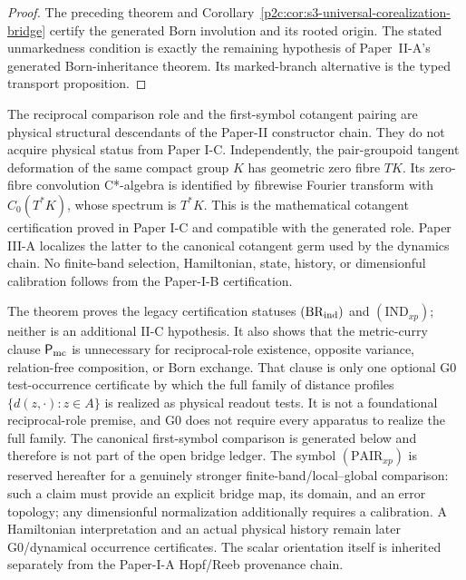 \documentclass[12pt,a4paper]{article}
\begin{document}
\begin{proof}
The preceding theorem and
Corollary~\ref{p2c:cor:s3-universal-corealization-bridge} certify the generated
Born involution and its rooted origin.  The stated unmarkedness condition is
exactly the remaining hypothesis of Paper~II-A's generated Born-inheritance
theorem.  Its marked-branch alternative is the typed transport proposition.
\end{proof}


\begin{remark}
\label{p2c:rem:reciprocal-role-logical-direction}
The reciprocal comparison role and the first-symbol cotangent pairing are
physical structural descendants of the Paper-II constructor chain. They do
not acquire physical status from Paper I-C. Independently, the pair-groupoid
tangent deformation of the same compact group $K$ has geometric zero fibre
$TK$. Its zero-fibre convolution C*-algebra is identified by fibrewise
Fourier transform with $C_0(T^*K)$, whose spectrum is $T^*K$.
This is the mathematical cotangent certification proved in Paper I-C and
compatible with the generated role. Paper III-A localizes the latter to the
canonical cotangent germ used by the dynamics chain. No finite-band selection,
Hamiltonian, state, history, or dimensionful calibration follows from the
Paper-I-B certification.
\end{remark}

\begin{remark}
\label{p2c:rem:reciprocal-role-derived-boundary}
The theorem proves the legacy certification statuses
\((\mathrm{BR}_{\rm ind})\) and \((\mathrm{IND}_{xp})\); neither is an
additional II-C hypothesis.  It also shows that the metric-curry clause
\(\mathsf P_{\rm mc}\) is unnecessary for reciprocal-role existence,
opposite variance, relation-free composition, or Born exchange.  That clause
is only one optional G0 test-occurrence certificate by which the full family
of distance profiles \(\{d(z,\cdot):z\in A\}\) is realized as physical
readout tests.  It is not a foundational reciprocal-role premise, and G0 does
not require every apparatus to realize the full family.
The canonical first-symbol comparison is generated below and therefore is
not part of the open bridge ledger.  The symbol \((\mathrm{PAIR}_{xp})\) is
reserved hereafter for a genuinely stronger finite-band/local--global
comparison: such a claim must provide an explicit bridge map, its domain, and
an error topology; any dimensionful normalization additionally requires a
calibration.  A Hamiltonian interpretation and an actual physical history
remain later G0/dynamical occurrence certificates.  The scalar orientation
itself is inherited separately from the Paper-I-A Hopf/Reeb provenance chain.
\end{remark}
\end{document}
